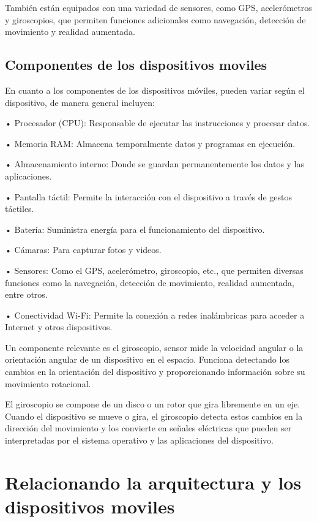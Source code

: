 \documentclass{article}
\begin{document}
\begin{multicols}{2}
		También están equipados con una variedad de sensores, como GPS, acelerómetros y giroscopios, que permiten funciones adicionales como navegación, detección de movimiento y realidad aumentada.
		
		\subsection{Componentes de los dispositivos moviles}
		En cuanto a los componentes de los dispositivos móviles, pueden variar según el dispositivo, de manera general incluyen:
		
		• Procesador (CPU): Responsable de ejecutar las instrucciones y procesar datos.
		
		• Memoria RAM: Almacena temporalmente datos y programas en ejecución.
		
		• Almacenamiento interno: Donde se guardan permanentemente los datos y las aplicaciones.
	
		• Pantalla táctil: Permite la interacción con el dispositivo a través de gestos táctiles.
	
		• Batería: Suministra energía para el funcionamiento del dispositivo.
		
		• Cámaras: Para capturar fotos y videos.
		
		• Sensores: Como el GPS, acelerómetro, giroscopio, etc., que permiten diversas funciones como la navegación, detección de movimiento, realidad aumentada, entre otros.
		
		• Conectividad Wi-Fi: Permite la conexión a redes inalámbricas para acceder a Internet y otros dispositivos.
		
		Un componente relevante es el giroscopio, sensor mide la velocidad angular o la orientación angular de un dispositivo en el espacio. Funciona detectando los cambios en la orientación del dispositivo y proporcionando información sobre su movimiento rotacional.
		
		El giroscopio se compone de un disco o un rotor que gira libremente en un eje. Cuando el dispositivo se mueve o gira, el giroscopio detecta estos cambios en la dirección del movimiento y los convierte en señales eléctricas que pueden ser interpretadas por el sistema operativo y las aplicaciones del dispositivo.
		
		\section{Relacionando la arquitectura y los dispositivos moviles}
		

\end{multicols}
\end{document}
